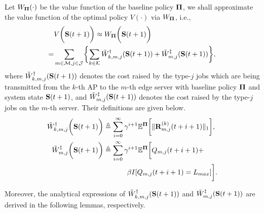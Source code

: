 Let $W_{\boldsymbol{\Pi}}(\cdot)$ be the value function of the baseline policy $\boldsymbol{\Pi}$, we shall approximate the value function of the optimal policy $V(\cdot)$ via $W_{\boldsymbol{\Pi}}$, i.e.,
{\small
\begin{align}
    &V\Paren{\Stat(t+1)} \approx W_{\Baseline}\Paren{\Stat(t+1)}
    \nonumber\\
    =& \sum_{m\in\esSet,j\in\jSpace}\Brace{
        \sum_{k\in\apSet} \tilde{W}^{\AP}_{k,m,j}(\Stat(t+1))
        +\tilde{W}^{\ES}_{m,j}(\Stat(t+1))
    },
    \label{eqn:baseline}
\end{align}
}%
where $\tilde{W}^{\dagger}_{k,m,j}(\mathbf{S}(t+1))$ denotes the cost raised by the type-$j$ jobs which are being transmitted from the $k$-th AP to the $m$-th edge server with baseline policy $\boldsymbol{\Pi}$ and system state $\mathbf{S}(t+1)$, and $\tilde{W}^{\ddagger}_{m,j}(\mathbf{S}(t+1))$ denotes the cost raised by the type-$j$ jobs on the $m$-th server.
Their definitions are given below.
{\small
\begin{align}
    \tilde{W}^{\dagger}_{k,m,j} \bigg(\mathbf{S}(t+1)\bigg) &\triangleq
        \sum_{i=0}^{\infty} \gamma^{i+1} \mathbb{E}^{\boldsymbol{\Pi}}\bigg[
            \lVert\mathbf{R}^{(k)}_{m,j}(t+i+1)\|_1
        \bigg],
    \\    
    \tilde{W}^{\ddagger}_{m,j} \bigg(\mathbf{S}(t+1)\bigg) &\triangleq
        \sum_{i=0}^{\infty} \gamma^{i+1} \mathbb{E}^{\boldsymbol{\Pi}}\bigg[
            Q_{m,j}(t+i+1) +
            \nonumber\\
            &~~~~~~~~~~\beta I[Q_{m,j}(t+i+1) = L_{max}]
        \bigg].
\end{align}
}

Moreover, the analytical expressions of $\tilde{W}^{\dagger}_{k,m,j}(\mathbf{S}(t+1))$ and $\tilde{W}^{\ddagger}_{m,j}(\mathbf{S}(t+1))$ are derived in the following lemmas, respectively.

